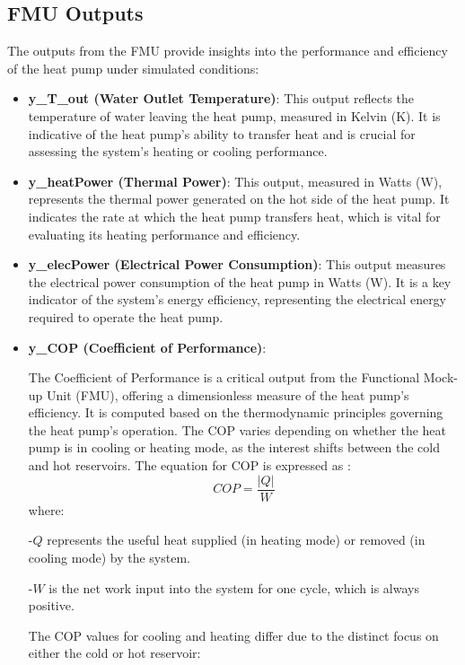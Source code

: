 \documentclass{report}
\begin{document}
\subsection{FMU Outputs }
The outputs from the FMU provide insights into the performance and efficiency of the heat pump under simulated conditions:

\begin{itemize}
    \item \textbf{y\_T\_out (Water Outlet Temperature)}: This output reflects the temperature of water leaving the heat pump, measured in Kelvin (K). It is indicative of the heat pump's ability to transfer heat and is crucial for assessing the system's heating or cooling performance.

    \item \textbf{y\_heatPower (Thermal Power)}: This output, measured in Watts (W), represents the thermal power generated on the hot side of the heat pump. It indicates the rate at which the heat pump transfers heat, which is vital for evaluating its heating performance and efficiency.

    \item \textbf{y\_elecPower (Electrical Power Consumption)}: This output measures the electrical power consumption of the heat pump in Watts (W). It is a key indicator of the system's energy efficiency, representing the electrical energy required to operate the heat pump.

    \item \textbf{y\_COP (Coefficient of Performance)}: 

    The Coefficient of Performance is a critical output from the Functional Mock-up Unit (FMU), offering a dimensionless measure of the heat pump's efficiency. It is computed based on the thermodynamic principles governing the heat pump's operation. The COP varies depending on whether the heat pump is in cooling or heating mode, as the interest shifts between the cold and hot reservoirs. 
    The equation for COP is expressed as \cite{Chesser2021}:
    \begin{equation}
        COP = \frac{|Q|}{W}
    \end{equation}
    where:
    
    -\( Q \) represents the useful heat supplied (in heating mode) or removed (in cooling mode) by the system.
    
    -\( W \) is the net work input into the system for one cycle, which is always positive.
    
    The COP values for cooling and heating differ due to the distinct focus on either the cold or hot reservoir:
    

\end{itemize}
\end{document}
